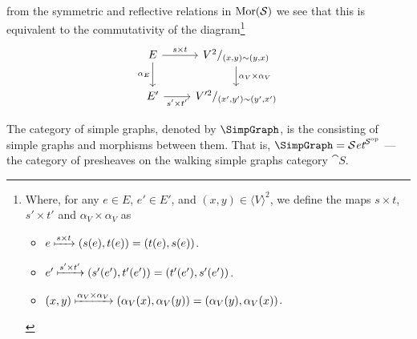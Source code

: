 \begin{definition}
\begin{itemize}
\[\begin{tikzcd}
        \end{tikzcd}
      \]
      from the symmetric and reflective relations in \(\operatorname{Mor}(\mathcal S)\) we see
      that this is equivalent to the commutativity of the diagram\footnote{
        Where, for any \(e \in E\), \(e' \in E'\), and \((x, y) \in \langle V
        \rangle^2\), we define the maps \(s \times t\), \(s' \times t'\) and
        \(\alpha_V \times \alpha_V\) as
        \begin{itemize}
          \setlength\itemsep{0.0em}
          \item \(e \xmapsto{s \times t} (s(e), t(e)) = (t(e), s(e))\).
          \item \(e' \xmapsto{s' \times t'} (s'(e'), t'(e')) = (t'(e'),
            s'(e'))\).
          \item \((x, y) \xmapsto{\alpha_V \times \alpha_V} (\alpha_V(x),
            \alpha_V(y)) = (\alpha_V(y), \alpha_V(x))\).
        \end{itemize}
      }
      \[
        \begin{tikzcd}
          E \ar[r, "s \times t"]
          \ar[d, swap, "\alpha_E"]
          &V^2/_{(x, y) \sim (y, x)}
          \ar[d, "\alpha_V \times \alpha_V"]
          \\
          E' \ar[r, swap, "s' \times t'"] &V'^2/_{(x', y') \sim (y', x')}
        \end{tikzcd}
      \]
  \end{itemize}
\end{definition}

\begin{definition}
  The category of simple graphs, denoted by \(\SimpGraph\), is the consisting of
  simple graphs and morphisms between them. That is, \(\SimpGraph = \Set^{\cat
  S^\op}\) --- the category of presheaves on the walking simple graphs category
  \(\cat S\).
\end{definition}
